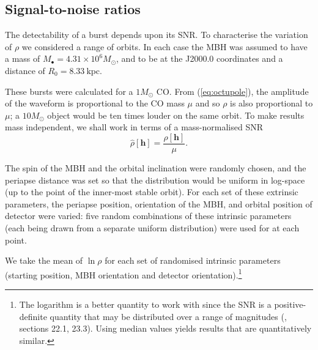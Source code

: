 \documentclass[useAMS,usedcolumn,usegraphicx,usenatbib]{mn2e}
\newcommand{\eqnref}[1]{(\ref{eq:#1})}
\begin{document}
\subsection{Signal-to-noise ratios}

The detectability of a burst depends upon its SNR. To characterise the variation of $\rho$ we considered a range of orbits. In each case the MBH was assumed to have a mass of $M_\bullet = 4.31 \times 10^6 M_\odot$, and to be at the J2000.0 coordinates and a distance of $R_0 = 8.33~\mathrm{kpc}$.

These bursts were calculated for a $1 M_\odot$ CO. From \eqnref{octupole}, the amplitude of the waveform is proportional to the CO mass $\mu$ and so $\rho$ is also proportional to $\mu$; a $10 M_\odot$ object would be ten times louder on the same orbit. To make results mass independent, we shall work in terms of a mass-normalised SNR
\begin{equation}
\hat{\rho}[\boldsymbol{h}] = \frac{\rho[\boldsymbol{h}]}{\mu}.
\end{equation}

The spin of the MBH and the orbital inclination were randomly chosen, and the periapse distance was set so that the distribution would be uniform in log-space (up to the point of the inner-most stable orbit). For each set of these extrinsic parameters, the periapse position, orientation of the MBH, and orbital position of detector were varied: five random combinations of these intrinsic parameters (each being drawn from a separate uniform distribution) were used for at each point.

We take the mean of $\ln \rho$ for each set of randomised intrinsic parameters (starting position, MBH orientation and detector orientation).\footnote{The logarithm is a better quantity to work with since the SNR is a positive-definite quantity that may be distributed over a range of magnitudes (\citealt{MacKay2003}, sections 22.1, 23.3). Using median values yields results that are quantitatively similar.}
\end{document}
